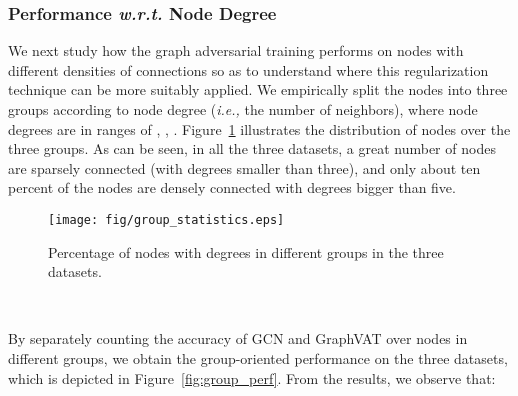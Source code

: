 \documentclass[10pt,journal,compsoc]{IEEEtran}
\newcommand{\ie}{\emph{i.e., }}
\newcommand{\wrt}{\emph{w.r.t. }}
\begin{document}
\subsubsection{Performance \wrt Node Degree}
We next study how the graph adversarial training performs on nodes with different densities of connections so as to understand where this regularization technique can be more suitably applied. We empirically split the nodes into three groups according to node degree (\ie the number of neighbors), where node degrees are in ranges of , , . Figure~\ref{fig:group_stat} illustrates the distribution of nodes over the three groups. As can be seen, in all the three datasets, a great number of nodes are sparsely connected (with degrees smaller than three), and only about ten percent of the nodes are densely connected with degrees bigger than five. \begin{figure}[htb]
	\centering
	\texttt{[image: fig/group\_statistics.eps]} 
	\vspace{-0.2cm}
	\caption{Percentage of nodes with degrees in different groups in the three datasets.}
\label{fig:group_stat}
\end{figure}
\begin{figure*}[]
	\centering
	\mbox{
		\hspace{-0.1in}
		\hspace{-0.15in}
		\hspace{-0.15in}
	}
	\vspace{-0.2cm}
	\caption{Performance of GCN and GraphVAT on nodes with different degrees in Citeseer (a), Cora (b), and NELL (c).
	}
	\label{fig:group_perf}
\end{figure*}
By separately counting the accuracy of GCN and GraphVAT over nodes in different groups, we obtain the group-oriented performance on the three datasets, which is depicted in Figure~\ref{fig:group_perf}. From the results, we observe that:
\end{document}
